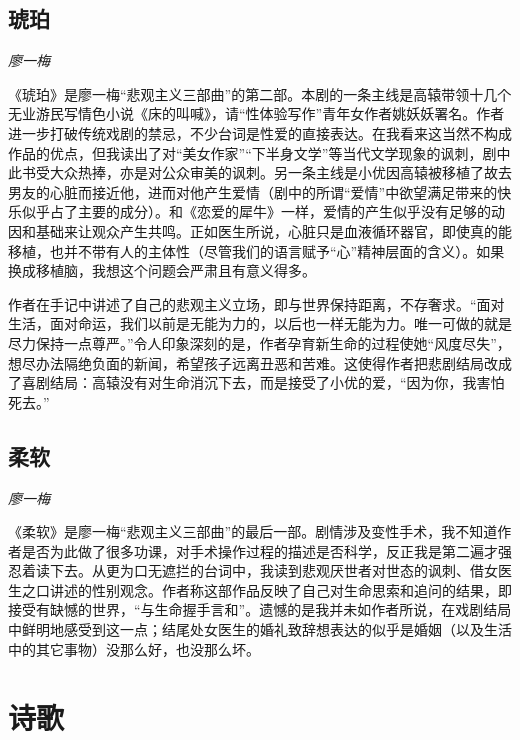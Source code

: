\subsection*{琥珀}
\par \emph{廖一梅}

\par 《琥珀》是廖一梅“悲观主义三部曲”的第二部。本剧的一条主线是高辕带领十几个无业游民写情色小说《床的叫喊》，请“性体验写作”青年女作者姚妖妖署名。作者进一步打破传统戏剧的禁忌，不少台词是性爱的直接表达。在我看来这当然不构成作品的优点，但我读出了对“美女作家”“下半身文学”等当代文学现象的讽刺，剧中此书受大众热捧，亦是对公众审美的讽刺。另一条主线是小优因高辕被移植了故去男友的心脏而接近他，进而对他产生爱情（剧中的所谓“爱情”中欲望满足带来的快乐似乎占了主要的成分）。和《恋爱的犀牛》一样，爱情的产生似乎没有足够的动因和基础来让观众产生共鸣。正如医生所说，心脏只是血液循环器官，即使真的能移植，也并不带有人的主体性（尽管我们的语言赋予“心”精神层面的含义）。如果换成移植脑，我想这个问题会严肃且有意义得多。
\par 作者在手记中讲述了自己的悲观主义立场，即与世界保持距离，不存奢求。“面对生活，面对命运，我们以前是无能为力的，以后也一样无能为力。唯一可做的就是尽力保持一点尊严。”令人印象深刻的是，作者孕育新生命的过程使她“风度尽失”，想尽办法隔绝负面的新闻，希望孩子远离丑恶和苦难。这使得作者把悲剧结局改成了喜剧结局：高辕没有对生命消沉下去，而是接受了小优的爱，“因为你，我害怕死去。”
\par {}

\subsection*{柔软}
\par \emph{廖一梅}

\par 《柔软》是廖一梅“悲观主义三部曲”的最后一部。剧情涉及变性手术，我不知道作者是否为此做了很多功课，对手术操作过程的描述是否科学，反正我是第二遍才强忍着读下去。从更为口无遮拦的台词中，我读到悲观厌世者对世态的讽刺、借女医生之口讲述的性别观念。作者称这部作品反映了自己对生命思索和追问的结果，即接受有缺憾的世界，“与生命握手言和”。遗憾的是我并未如作者所说，在戏剧结局中鲜明地感受到这一点；结尾处女医生的婚礼致辞想表达的似乎是婚姻（以及生活中的其它事物）没那么好，也没那么坏。
\par {}




\section{诗歌}

